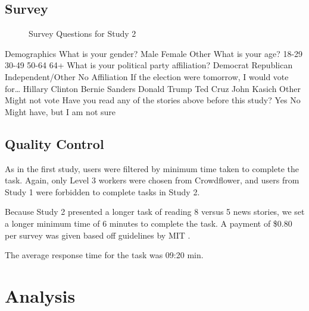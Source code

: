 
 
 
 
\subsection{Survey}


\begin{figure}[h!] 
\centering
  \caption{Survey Questions for Study 2}
\end{figure}



Demographics
What is your gender?
 Male
 Female
 Other
What is your age?
 18-29
 30-49
 50-64
 64+
What is your political party affiliation?
 Democrat
 Republican
 Independent/Other
 No Affiliation
If the election were tomorrow, I would vote for…
 Hillary Clinton
 Bernie Sanders
 Donald Trump
 Ted Cruz
 John Kasich
 Other
 Might not vote
Have you read any of the stories above before this study?
 Yes
 No
 Might have, but I am not sure





\subsection{Quality Control}

As in the first study, users were filtered by minimum time taken to complete the task. Again, only Level 3 workers were chosen from Crowdflower, and users from Study 1 were forbidden to complete tasks in Study 2. 

Because Study 2 presented a longer task of reading 8 versus 5 news stories, we set a longer minimum time of 6 minutes to complete the task. A payment of \$0.80 per survey was given based off guidelines by MIT \cite{COUHES-turk}.

The average response time for the task was 09:20 min.

\section{Analysis}







 


